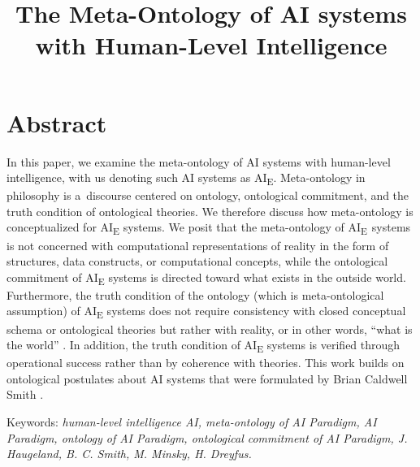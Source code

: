 

\title{The Meta-Ontology of AI systems with Human-Level Intelligence}
\maketitle

\section{Abstract}
In this paper, we examine the meta-ontology of AI systems with human-level intelligence, with us denoting such AI systems as AI\textsubscript{E}. Meta-ontology in philosophy is a~discourse centered on ontology, ontological commitment, and the truth condition of ontological theories. We therefore discuss how meta-ontology is conceptualized for AI\textsubscript{E} systems. We posit that the meta-ontology of AI\textsubscript{E~}systems is not concerned with computational representations of reality in the form of structures, data constructs, or computational concepts, while the ontological commitment of AI\textsubscript{E} systems is directed toward what exists in the outside world. Furthermore, the truth condition of the ontology (which is meta-ontological assumption) of AI\textsubscript{E} systems does not require consistency with closed conceptual schema or ontological theories but rather with reality, or in other words, ``what is the world''
\parencite[][p.57]{smith_promise_2019}. %
 In addition, the truth condition of AI\textsubscript{E} systems is verified through operational success rather than by coherence with theories. This work builds on ontological postulates about AI systems that were formulated by Brian Caldwell Smith 
\parencite*[][]{smith_promise_2019}.%


Keywords: \textit{human-level intelligence AI, meta-ontology of AI Paradigm, AI Paradigm, ontology of AI Paradigm, ontological commitment of AI Paradigm, J. Haugeland, B. C. Smith, M. Minsky, H. Dreyfus.}


